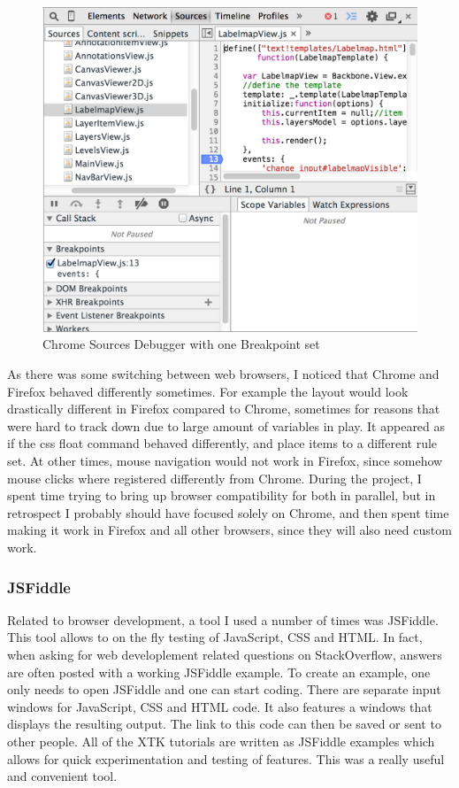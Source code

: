 \documentclass[a4paper,11pt,titlepage]{article}
\begin{document}
\begin{figure}[ht!]
\centering
\includegraphics[width=140mm]{graphics/chromeDebugger_01.png}
\caption{Chrome Sources Debugger with one Breakpoint set}
\label{fig:UIdesign1}
\end{figure}



As there was some switching between web browsers, I noticed that Chrome and Firefox behaved differently sometimes. For example the layout would look drastically different in Firefox compared to Chrome, sometimes for reasons that were hard to track down due to large amount of variables in play. It appeared as if the css float command behaved differently, and place items to a different rule set. At other times, mouse navigation would not work in Firefox, since somehow mouse clicks where registered differently from Chrome. During the project, I spent time trying to bring up browser compatibility for both in parallel, but in retrospect I probably should have focused solely on Chrome, and then spent time making it work in Firefox and all other browsers, since they will also need custom work.


\subsubsection{JSFiddle}

Related to browser development, a tool I used a number of times was JSFiddle. This tool allows to on the fly testing of JavaScript, CSS and HTML. In fact, when asking for web developlement related questions on StackOverflow, answers are often posted with a working JSFiddle example. To create an example, one only needs to open JSFiddle and one can start coding. There are separate input windows for JavaScript, CSS and HTML code. It also features a windows that displays the resulting output. The link to this code can then be saved or sent to other people. All of the XTK tutorials are written as JSFiddle examples which allows for quick experimentation and testing of features. This was a really useful and convenient tool. 
\end{document}
